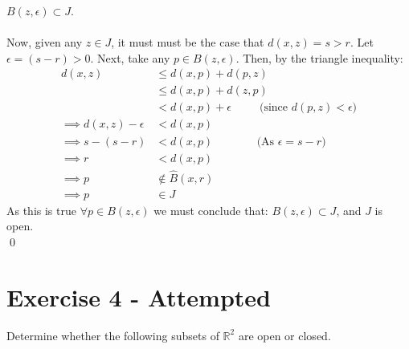 \documentclass[12pt]{article}
\begin{document}
$B(z, \epsilon) \subset J$.\\
\\
Now, given any $z \in J$, it must must be the case that $d(x, z) = s > r$.  Let $\epsilon = (s-r) > 0$.  Next, take any $p \in B(z,\epsilon)$.
Then, by the triangle inequality:
\begin{align*}
d(x,z) &\le d(x, p) + d(p, z) \\
 &\le d(x, p) + d(z, p) \\
 &< d(x, p) + \epsilon \;\;\;\;\;\;\;\;\; \text{(since $d(p,z) < \epsilon$)} \\
 \implies d(x,z) - \epsilon &< d(x, p) \\
 \implies s - (s-r) &< d(x, p) \;\;\;\;\;\;\;\;\;\;\;\;\;\; \text{(As $\epsilon=s-r$)}\\
\implies r &< d(x, p) \\
\implies p &\notin \hat{B}(x, r) \\
\implies p &\in J 
\end{align*}
As this is true $\forall p \in B(z,\epsilon)$ we must conclude that: $B(z,\epsilon) \subset J$, and $J$ is open.\\
\qed



\newpage

\section*{Exercise 4 - Attempted}

\noindent

Determine whether the following subsets of $\mathbb{R}^2$ are open or closed.
\end{document}
